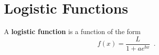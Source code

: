 \section{Logistic Functions}
\label{sec:logistic}


\begin{definition}
  A {\bf logistic function} is a function of the form
  $$f(x) = \dfrac{L}{1+ae^{bx}} \enspace .$$
\end{definition}
